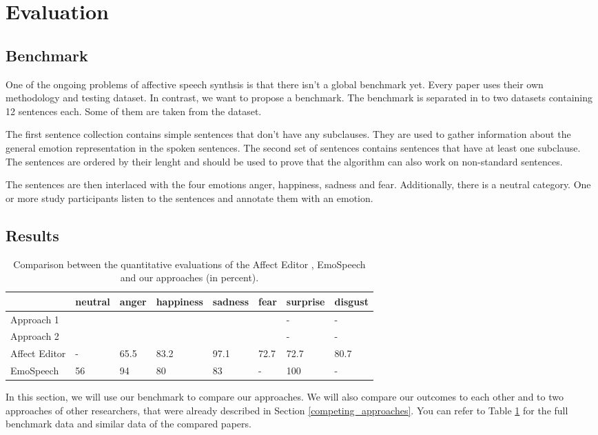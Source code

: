 \documentclass[11pt]{article}
\begin{document}
\section{Evaluation}
\label{evaluation}

\subsection{Benchmark}
One of the ongoing problems of affective speech synthsis is that there isn't a global benchmark yet\cite{triantafyllopoulos_overview_2023}. Every paper uses their own methodology and testing dataset. In contrast, we want to propose a benchmark. The benchmark is separated in to two datasets containing 12 sentences each. Some of them are taken from the \cite{saravia-etal-2018-carer} dataset.

The first sentence collection contains simple sentences that don't have any subclauses. They are used to gather information about the general emotion representation in the spoken sentences. The second set of sentences contains sentences that have at least one subclause. The sentences are ordered by their lenght and should be used to prove that the algorithm can also work on non-standard sentences.

The sentences are then interlaced with the four emotions anger, happiness, sadness and fear. Additionally, there is a neutral category. One or more study participants listen to the sentences and annotate them with an emotion.


\subsection{Results}
\begin{table}[t]

\centering
\vspace{5px}
{
\begin{tabular}{|p{2cm}|p{1.5cm}|p{1.5cm}|p{1.5cm}|p{1.5cm}|p{1.5cm}|p{1.5cm}|p{1.5cm}|}
\hline
\rowcolor{mintgreen}&neutral&anger&happiness&sadness&fear&surprise&disgust\\
\hline
\cellcolor{gainsboro}Approach 1&&&&&&-&-\\
\hline
\cellcolor{gainsboro}Approach 2&&&&&&-&-\\
\hline
\hline
\cellcolor{gainsboro}Affect Editor& -&65.5&83.2&97.1&72.7&72.7&80.7\\
\hline
\cellcolor{gainsboro}EmoSpeech&56 &94&80 &83&-&100&-\\
\hline
\end{tabular}
}

\caption{Comparison between the quantitative evaluations of the Affect Editor \cite{cahn_generation_2000}, EmoSpeech \cite{diatlova_emospeech_2023} and our approaches (in percent).}
\label{Tabelle}
\end{table}
In this section, we will use our benchmark to compare our approaches. We will also compare our outcomes to each other and to two approaches of other researchers, that were already described in Section \ref{competing_approaches}. You can refer to Table \ref{Tabelle} for the full benchmark data and similar data of the compared papers.
\end{document}
